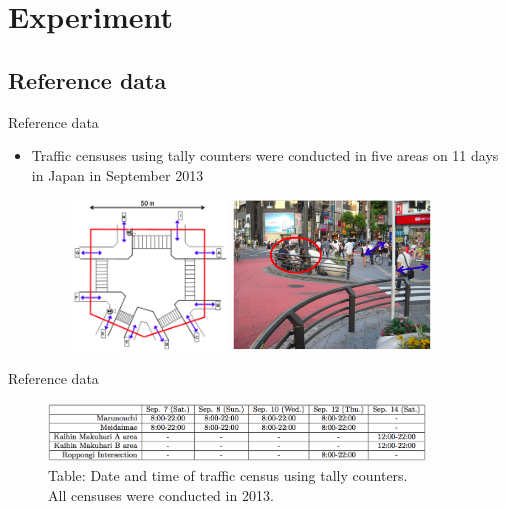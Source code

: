 \section{Experiment}\label{experiment}

\subsection{Reference data}\label{reference-data}

\begin{frame}{Reference data}

\begin{itemize}
\itemsep1pt\parskip0pt
\item
  Traffic censuses using tally counters were conducted in five areas on
  11 days in Japan in September 2013

  \begin{figure}
  \includegraphics[height = 4cm]{pic8.png}
  \includegraphics[height = 4cm]{pic9.png}
  \end{figure}
\end{itemize}

\end{frame}

\begin{frame}{Reference data}

\begin{figure}
\includegraphics[width = 10cm]{pic10.png}\\
Table: Date and time of traffic census using tally counters.\\
All censuses were conducted in 2013.
\end{figure}

\end{frame}

